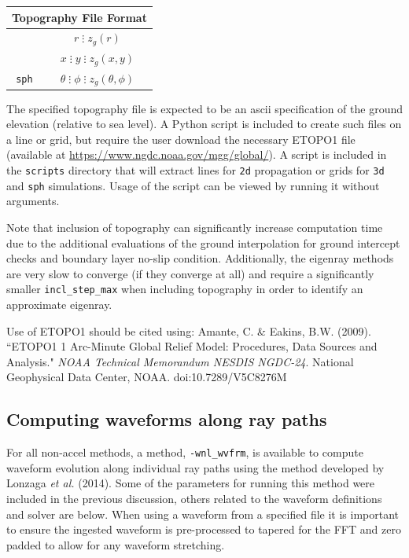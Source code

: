 \documentclass[10pt]{article}
\begin{document}
\begin{center}
\begin{tabular}{| c | c |}
  \hline
  \multicolumn{2}{|c|}{\textbf{Topography File Format}} \\
  \hline
  \verb#2d#	 	& \(r \; \vdots \; z_g \left( r \right) \) \\ \hline
  \verb#3d#	 	& \(x \; \vdots \; y \; \vdots \; z_g \left( x, y \right) \) \\ \hline
  \verb#sph#	 	& \(\theta \; \vdots \; \phi \; \vdots \; z_g \left( \theta, \phi \right) \) \\ \hline
\end{tabular}
\end{center}

The specified topography file is expected to be an ascii specification of the ground elevation (relative to sea level).  A Python script is included to create such files on a line or grid, but require the user download the necessary ETOPO1 file (available at \url{https://www.ngdc.noaa.gov/mgg/global/}).  A script is included in the \verb=scripts= directory that will extract lines for \verb=2d= propagation or grids for \verb=3d= and \verb=sph= simulations.  Usage of the script can be viewed by running it without arguments.

Note that inclusion of topography can significantly increase computation time due to the additional evaluations of the ground interpolation for ground intercept checks and boundary layer no-slip condition.   Additionally, the eigenray methods are very slow to converge (if they converge at all) and require a significantly smaller \verb=incl_step_max= when including topography in order to identify an approximate eigenray.  

Use of ETOPO1 should be cited using: Amante, C. \& Eakins, B.W. (2009). ``ETOPO1 1 Arc-Minute Global Relief Model: Procedures, Data Sources and Analysis."  \textit{NOAA Technical Memorandum NESDIS NGDC-24}. National Geophysical Data Center, NOAA. doi:10.7289/V5C8276M


\subsection{Computing waveforms along ray paths}
\label{Sect:AdditionalParams:wvfrms}

For all non-accel methods, a method, \verb=-wnl_wvfrm=, is available to compute waveform evolution along individual ray paths using the method developed by Lonzaga \textit{et al.} (2014). Some of the parameters for running this method were included in the previous discussion, others related to the waveform  definitions and solver are below.  When using a waveform from a specified file it is important to ensure the ingested waveform is pre-processed to tapered for the FFT and zero padded to allow for any waveform stretching.\\
\end{document}
